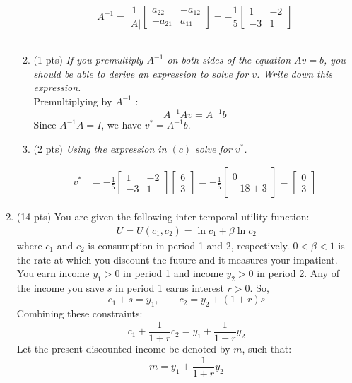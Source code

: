 \documentclass{./../../Latex/tests}
\begin{document}
\begin{enumerate}
\begin{enumerate}
   $$ A^{-1} = \frac{1}{|A|} \left[ \begin{array}{cc} a_{22} & -a_{12} \\ -a_{21} &  a_{11}  \end{array} \right] = -\frac{1}{5} \left[ \begin{array}{cc} 1 & -2 \\ -3 &  1  \end{array} \right]  $$ \\
   
 
  \item (1 pts) \textit{If you premultiply $A^{-1}$ on both sides of the equation $ Av=b $, you should be able to derive an expression to solve for $v$. Write down this expression. } \\

  Premultiplying by $A^{-1}$ :
$$
A^{-1} A v=A^{-1} b 
$$
Since $A^{-1} A=I$, we have  $v^*=A^{-1} b$. \\


  
  \item (2 pts) \textit{Using the expression in $(c)$ solve for $v^*$. } 

$$
\begin{aligned}
v^{*} &=-\frac{1}{5} \left[ \begin{array}{cc} 1 & -2 \\ -3 &  1  \end{array} \right] \left[\begin{array}{c}6 \\ 3 \end{array}\right] = -\frac{1}{5} \left[ \begin{array}{c} 0 \\ -18+3  \end{array} \right] =  \left[ \begin{array}{c} 0 \\ 3  \end{array} \right]
\end{aligned}
$$
\end{enumerate}

\newpage
\item (14 pts) You are given the following inter-temporal utility function:
\begin{align}
	U = U(c_1, c_2) =  \ln c_1 + \beta \ln c_2
\end{align}
where $c_1$ and $c_2$ is consumption in period 1 and 2, respectively. $0<\beta<1$ is the rate at which you discount the future and it measures your impatient. You earn income $y_1>0$ in period 1 and income $y_2>0$ in period 2. Any of the income you save $s$ in period 1 earns interest $r>0$. So, $$ c_1 + s = y_1, \quad \quad c_2 = y_2 + (1+r) s $$
Combining these constraints:
$$ c_1 + \frac{1}{1+r} c_2 = y_1 + \frac{1}{1+r} y_2 $$
Let the present-discounted income be denoted by $m$, such that:
$$ m = y_1 + \frac{1}{1+r} y_2 $$


\end{enumerate}
\end{document}
